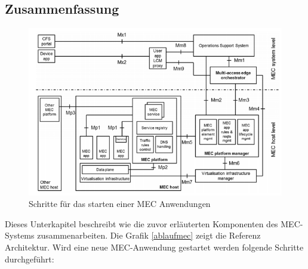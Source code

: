 \documentclass[runningheads]{llncs}
\numberwithin{figure}{section}
\begin{document}
\subsection{Zusammenfassung}
\begin{figure}
  \includegraphics[width=\linewidth]{images/mecarchitecture.png}
  \caption{Schritte für das starten einer MEC Anwendungen}
  \label{fig:ablaufmec}
\end{figure}
Dieses Unterkapitel beschreibt wie die zuvor erläuterten Komponenten des MEC-Systems zusammenarbeiten. Die Grafik \ref{ablaufmec} zeigt die 
Referenz Architektur. Wird eine neue MEC-Anwendung gestartet werden folgende Schritte durchgeführt:
\end{document}
